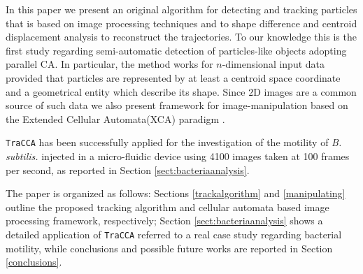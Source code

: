 \documentclass[conference]{IEEEtran}
\begin{document}
In this paper we present an original algorithm for detecting and tracking particles that is based on image processing techniques and to shape difference and centroid displacement analysis to reconstruct the trajectories. To our knowledge this is the first study regarding semi-automatic detection of particles-like objects adopting parallel CA. In particular, the method works for $n$-dimensional input data provided that particles are represented by at least a centroid space coordinate and a geometrical entity which describe its shape. 
Since $2$D images are a common source of such data we also present framework for image-manipulation based on the Extended Cellular Automata(XCA) paradigm .

\texttt{TraCCA} has been successfully applied for the investigation of the motility of \textit{B. subtilis.} injected in a micro-fluidic device using 4100 images taken at 100 frames per second, as reported in Section \ref{sect:bacteriaanalysis}.

The paper is organized as follows: Sections  \ref{trackalgorithm} and \ref{manipulating} outline the proposed tracking algorithm and cellular automata based image processing framework, respectively; Section \ref{sect:bacteriaanalysis} shows a detailed application of \texttt{TraCCA} referred to a real case study regarding bacterial motility, while conclusions and possible future works are reported in Section \ref{conclusions}.
\end{document}
